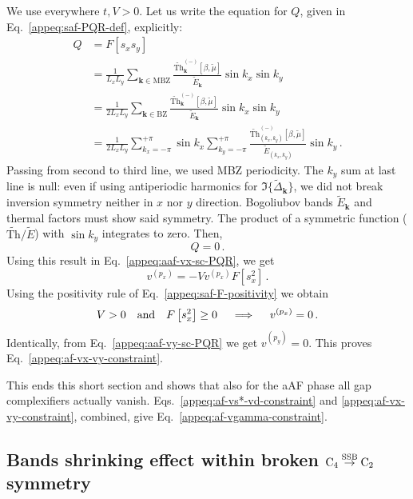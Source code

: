 \begin{tabproof}

	We use everywhere $t,V > 0$. Let us write the equation for $Q$, given in Eq.~\eqref{appeq:saf-PQR-def}, explicitly:
	\[
	\begin{aligned}
		Q &= F\left[s_x s_y\right] \\
		&= \frac{1}{L_x L_y} \sum_{\mathbf{k}\in\mathrm{MBZ}} \frac{\tilde{\mathrm{Th}}_\mathbf{k}^{(-)}[\beta,\tilde{\mu}]}{\tilde{E}_\mathbf{k}} \sin k_x \sin k_y \\
		&= \frac{1}{2L_x L_y} \sum_{\mathbf{k}\in\mathrm{BZ}} \frac{\tilde{\mathrm{Th}}_\mathbf{k}^{(-)}[\beta,\tilde{\mu}]}{\tilde{E}_\mathbf{k}} \sin k_x \sin k_y \\
		&= \frac{1}{2L_x L_y} \sum_{k_x=-\pi}^{+\pi} \sin k_x \sum_{k_y=-\pi}^{+\pi} \frac{\tilde{\mathrm{Th}}_{(k_x,k_y)}^{(-)}[\beta,\tilde{\mu}]}{\tilde{E}_{(k_x,k_y)}} \sin k_y \, .
	\end{aligned}
	\]
	Passing from second to third line, we used MBZ periodicity. The $k_y$ sum at last line is null: even if using antiperiodic harmonics for $\Im\lbrace \tilde{\Delta}_\mathbf{k} \rbrace$, we did not break inversion symmetry neither in $x$ nor $y$ direction. Bogoliubov bands $\tilde{E}_\mathbf{k}$ and thermal factors must show said symmetry. The product of a symmetric function ($\tilde{\mathrm{Th}}/\tilde{E}$) with $\sin k_y$ integrates to zero. Then,
	\[
		Q=0 \, .
	\]
	Using this result in Eq.~\eqref{appeq:aaf-vx-sc-PQR}, we get
	\[
		v^{(p_x)} = - V v^{(p_x)} F\left[ s_x^2 \right] \, .
	\]
	Using the positivity rule of Eq.~\eqref{appeq:saf-F-positivity} we obtain
	\[
		V > 0 \qq{and} F\left[ s_x^2 \right] \ge 0
		\quad\implies\quad
		v^{(p_x)} = 0 \, .
	\]
	Identically, from Eq.~\eqref{appeq:aaf-vy-sc-PQR} we get $v^{(p_y)}=0$. This proves Eq.~\eqref{appeq:af-vx-vy-constraint}.

\end{tabproof}

This ends this short section and shows that also for the aAF phase all gap complexifiers actually vanish. Eqs.~\eqref{appeq:af-vs*-vd-constraint} and \eqref{appeq:af-vx-vy-constraint}, combined, give Eq.~\eqref{appeq:af-vgamma-constraint}.

\subsection{Bands shrinking effect within broken $\mathrm{C}_4 \stackrel{\mathrm{SSB}}{\to} \mathrm{C}_2$ symmetry}\label{appsubsec:af-bands-shrinking-C2}

